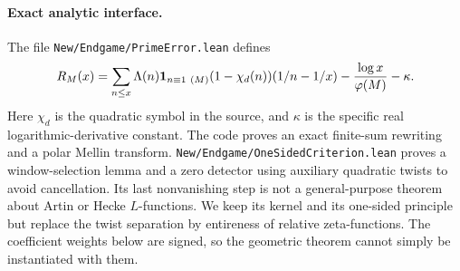 \documentclass[11pt]{article}
\theoremstyle{remark}\newtheorem{remark}[theorem]{Remark}
\begin{document}
\paragraph{Exact analytic interface.} The file \nolinkurl{New/Endgame/PrimeError.lean} defines
\begin{equation}\label{eq:source}
R_M(x)=\sum_{n\le x}\Lambda(n)\mathbf 1_{n\equiv1\ (M)}(1-\chi_d(n))
(1/n-1/x)-\frac{\log x}{\varphi(M)}-\kappa.
\end{equation}
Here $\chi_d$ is the quadratic symbol in the source, and $\kappa$ is the specific real logarithmic-derivative constant. The code proves an exact finite-sum rewriting and a polar Mellin transform. \nolinkurl{New/Endgame/OneSidedCriterion.lean} proves a window-selection lemma and a zero detector using auxiliary quadratic twists to avoid cancellation. Its last nonvanishing step is not a general-purpose theorem about Artin or Hecke $L$-functions. We keep its kernel and its one-sided principle but replace the twist separation by entireness of relative zeta-functions. The coefficient weights below are signed, so the geometric theorem cannot simply be instantiated with them.
\end{document}
